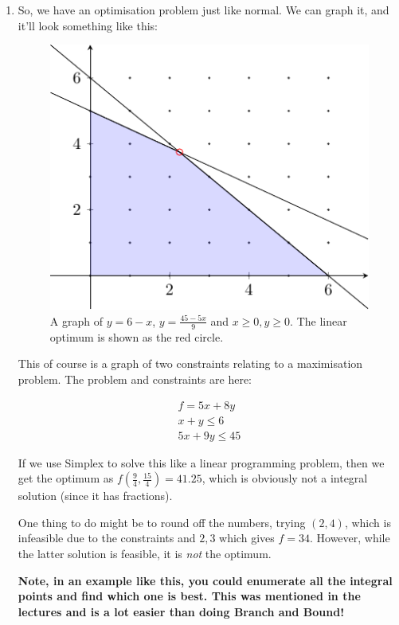 \begin{enumerate}
  \item So, we have an optimisation problem just like normal. We can graph it, 
  and it'll look something like this:

  \begin{figure}[H]
    \centering
    \includegraphics{diagrams/graph5}
    \caption{A graph of $y = 6 - x$, $y = \frac{45 - 5x}{9}$ and $x \geq 0,
      y \geq 0$. The linear optimum is shown as the red circle.}
    \label{fig:graph-5}
  \end{figure}

  This of course is a graph of two constraints relating to a maximisation
  problem. The problem and constraints are here:

  \[
    \begin{split}
      f = 5x + 8y\\
      x + y \leq 6\\
      5x + 9y \leq 45
    \end{split}
  \]

  If we use Simplex to solve this like a linear programming problem, then we get
  the optimum as $f(\frac{9}{4}, \frac{15}{4}) = 41.25$, which is obviously not
  a integral solution (since it has fractions).

  One thing to do might be to round off the numbers, trying $(2,4)$, which is
  infeasible due to the constraints and $2,3$ which gives $f=34$. However, while
  the latter solution is feasible, it is \textit{not} the optimum.

  \textbf{Note, in an example like this, you could enumerate all the integral 
  points and find which one is best. This was mentioned in the lectures and is 
  a lot easier than doing Branch and Bound!}


\end{enumerate}

